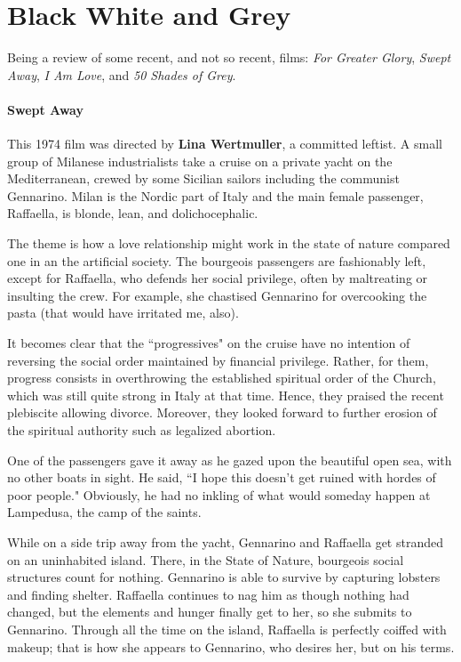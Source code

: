 \section{Black White and Grey}

Being a review of some recent, and not so recent, films: \emph{For Greater Glory}, \emph{Swept Away}, \emph{I Am Love}, and \emph{50 Shades of Grey}.

\paragraph{Swept Away}
This 1974 film was directed by \textbf{Lina Wertmuller}, a committed leftist. A small group of Milanese industrialists take a cruise on a private yacht on the Mediterranean, crewed by some Sicilian sailors including the communist Gennarino. Milan is the Nordic part of Italy and the main female passenger, Raffaella, is blonde, lean, and dolichocephalic.

The theme is how a love relationship might work in the state of nature compared one in an the artificial society. The bourgeois passengers are fashionably left, except for Raffaella, who defends her social privilege, often by maltreating or insulting the crew. For example, she chastised Gennarino for overcooking the pasta (that would have irritated me, also).

It becomes clear that the ``progressives" on the cruise have no intention of reversing the social order maintained by financial privilege. Rather, for them, progress consists in overthrowing the established spiritual order of the Church, which was still quite strong in Italy at that time. Hence, they praised the recent plebiscite allowing divorce. Moreover, they looked forward to further erosion of the spiritual authority such as legalized abortion.

One of the passengers gave it away as he gazed upon the beautiful open sea, with no other boats in sight. He said, ``I hope this doesn't get ruined with hordes of poor people." Obviously, he had no inkling of what would someday happen at Lampedusa, the camp of the saints.

While on a side trip away from the yacht, Gennarino and Raffaella get stranded on an uninhabited island. There, in the State of Nature, bourgeois social structures count for nothing. Gennarino is able to survive by capturing lobsters and finding shelter. Raffaella continues to nag him as though nothing had changed, but the elements and hunger finally get to her, so she submits to Gennarino. Through all the time on the island, Raffaella is perfectly coiffed with makeup; that is how she appears to Gennarino, who desires her, but on his terms.

